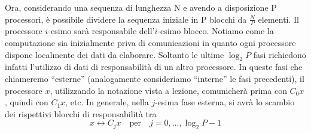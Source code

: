\documentclass[12pt,a4paper,oneside,openright]{article}
\begin{document}
Ora, considerando una sequenza di lunghezza N e avendo a disposizione P processori, è possibile dividere la sequenza iniziale in P blocchi da $\frac{N}{P}$ elementi. Il processore $i$-esimo sarà responsabile dell'$i$-esimo blocco. Notiamo come la computazione sia inizialmente priva di comunicazioni in quanto ogni processore dispone localmente dei dati da elaborare. Soltanto le ultime $\log_{2} P$ fasi richiedono infatti l'utilizzo di dati di responsabilità di un altro processore. In queste fasi che chiameremo ``esterne'' (analogamente consideriamo ``interne'' le fasi precedenti), il processore $x$, utilizzando la notazione vista a lezione, comunicherà prima con $C_{0}x$, quindi con $C_{1}x$, etc.
In generale, nella $j$-esima fase esterna, si avrà lo scambio dei rispettivi blocchi di responsabilità tra
$$x  \longleftrightarrow  C_{j}x \quad \textrm{per} \quad j=0,...,\log_{2} P-1 $$
\end{document}
